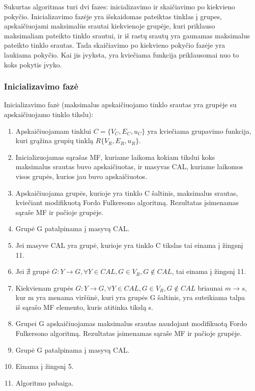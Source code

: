 Sukurtas algoritmas turi dvi fazes: inicializavimo ir skaičiavimo po kiekvieno pokyčio. Inicializavimo fazėje yra  išskaidomas pateiktas tinklas į grupes, apskaičiuojami maksimalūs srautai kiekvienoje grupėje, kuri priklauso maksimaliam pateikto tinklo srautui, ir iš rastų srautų yra gaunamas maksimalus pateikto tinklo srautas. Tada  skaičiavimo po kiekvieno pokyčio fazėje yra laukiama pokyčio. Kai jis įvyksta, yra kviečiama funkcija priklausomai nuo to koks pokytis įvyko.

\subsubsection{Inicializavimo fazė}

Inicializavimo fazė (maksimalus apskaičiuojamo tinklo srautas yra grupėje su apskaičiuojamo tinklo tikslu):
\begin{enumerate}
	\item Apskaičiuojamam tinklui $C=\{V_C, E_C, u_C\}$ yra kviečiama grupavimo funkcija, kuri grąžina grupių tinklą $R\{V_R, E_R, u_R\}$.
	\item Inicializuojamas sąrašas MF, kuriame  laikoma kokiam tikslui koks maksimalus srautas buvo apskaičiuotas, ir masyvas CAL, kuriame laikomos visos grupės, kurios jau buvo apskaičiuotos.
	\item Apskaičiuojama grupės, kurioje yra tinklo C šaltinis, maksimalus srautas, kviečiant modifikuotą Fordo Fulkersono algoritmą. Rezultatas įsimenamas sąraše MF ir pačioje grupėje.
	\item Grupė G patalpinama į masyvą CAL.
	\item Jei masyve CAL yra grupė, kurioje yra tinklo C tikslas tai einama į žingsnį 11.
	\item Jei $\nexists$ grupė $G : Y \rightarrow G, \forall Y \in CAL, G \in V_R, G \notin CAL$, tai einama į žingsnį 11.
	\item Kiekvienam grupės $G : Y \rightarrow G, \forall Y \in CAL, G \in V_R, G \notin CAL$ briaunai $m \rightarrow s$, kur m yra menama viršūnė, kuri yra grupės G šaltinis, yra suteikiama talpa iš sąrašo MF elemento, kuris atitinka tikslą s.
	 \item Grupei G apskaičiuojamas maksimalus srautas naudojant modifikuotą Fordo Fulkersono algoritmą.  Rezultatas įsimenamas sąraše MF ir pačioje grupėje.
	 \item Grupė G patalpinama į masyvą CAL.
	 \item Einama į žingsnį 5. 
	 \item Algoritmo pabaiga. 
\end{enumerate}

